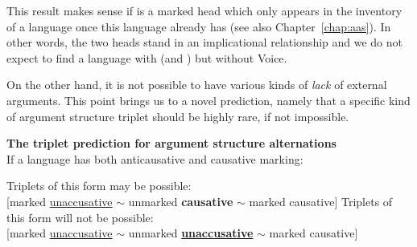 \begin{exe}
\begin{xlist}
\begin{xlist}
\begin{exe}
\begin{exe}
\begin{xlist}
\begin{exe}
\begin{xlist}
\begin{exe}
\begin{xlist}
\begin{xlist}
\begin{exe}
\begin{xlist}
\begin{exe}
\begin{xlist}
\begin{exe}
\begin{exe}
\begin{exe}
\begin{xlist}
\begin{exe}
\begin{exe}
\begin{xlist}
\begin{xlist}
\begin{exe}
\begin{xlist}
\begin{exe}
\begin{exe}
\begin{exe}
\begin{xlist}
\begin{exe}
\begin{exe}
\begin{xlist}
\begin{exe}
\begin{xlist}
\begin{exe}
\begin{xlist}
\begin{exe}
\begin{xlist}
\begin{exe}
\begin{exe}
\begin{xlist}
\begin{exe}
\begin{exe}
\begin{xlist}
\begin{xlist}
\begin{exe}
\begin{xlist}
\begin{xlist}
\begin{exe}
\begin{xlist}
\begin{exe}
\begin{xlist}
\begin{exe}
\begin{xlist}
\begin{exe}
\begin{xlist}
\begin{exe}
\begin{exe}
\begin{exe}
This result makes sense if {\vd} is a marked head which only appears in the inventory of a language once this language already has  (see also Chapter~\ref{chap:aas}). In other words, the two heads stand in an implicational relationship and we do not expect to find a language with {\vd} (and {\vz}) but without Voice.

On the other hand, it is not possible to have various kinds of \emph{lack} of external arguments. This point brings us to a novel prediction, namely that a specific kind of argument structure triplet should be highly rare, if not impossible.
 \begin{exe}
 \ex  \label{ex:vd:causpred}\textbf{The triplet prediction for argument structure alternations} \\
 	If a language has both anticausative and causative marking:
 \begin{xlist} 
 	\ex  Triplets of this form may be possible:\\
		{[}marked \underline{unaccusative} $\sim$ unmarked \textbf{causative} $\sim$ marked causative] 
 	\ex  Triplets of this form will not be possible:\\ 
	 	{[}marked \underline{unaccusative} $\sim$ unmarked \textbf{\underline{unaccusative}} $\sim$ marked causative]
 \z
\z 	


\end{xlist}
\end{exe}
\end{exe}
\end{exe}
\end{exe}
\end{xlist}
\end{exe}
\end{xlist}
\end{exe}
\end{xlist}
\end{exe}
\end{xlist}
\end{exe}
\end{xlist}
\end{xlist}
\end{exe}
\end{xlist}
\end{xlist}
\end{exe}
\end{exe}
\end{xlist}
\end{exe}
\end{exe}
\end{xlist}
\end{exe}
\end{xlist}
\end{exe}
\end{xlist}
\end{exe}
\end{xlist}
\end{exe}
\end{exe}
\end{xlist}
\end{exe}
\end{exe}
\end{exe}
\end{xlist}
\end{exe}
\end{xlist}
\end{xlist}
\end{exe}
\end{exe}
\end{xlist}
\end{exe}
\end{exe}
\end{exe}
\end{xlist}
\end{exe}
\end{xlist}
\end{exe}
\end{xlist}
\end{xlist}
\end{exe}
\end{xlist}
\end{exe}
\end{xlist}
\end{exe}
\end{exe}
\end{xlist}
\end{xlist}
\end{exe}
